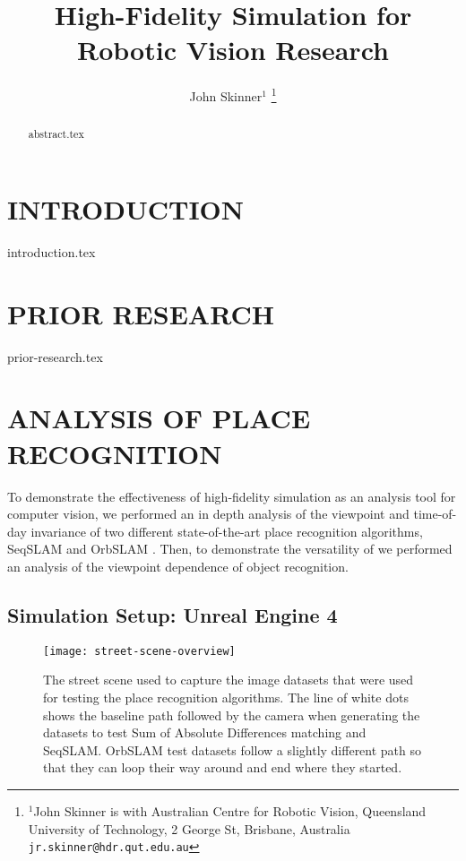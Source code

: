 \documentclass[letterpaper, 10 pt, conference]{ieeeconf}  %
\title{\LARGE \bf
High-Fidelity Simulation for Robotic Vision Research
}
\author{John Skinner$^{1}$%
\thanks{$^{1}$John Skinner is with Australian Centre for Robotic Vision,
        Queensland University of Technology,
        2 George St, Brisbane, Australia
        {\tt\small jr.skinner@hdr.qut.edu.au}}%
}
\begin{document}
\maketitle
\thispagestyle{empty}
\pagestyle{empty}


\begin{abstract}

{abstract.tex}

\end{abstract}


\section{INTRODUCTION}

{introduction.tex}

\section{PRIOR RESEARCH}

{prior-research.tex}

\section{ANALYSIS OF PLACE RECOGNITION}

To demonstrate the effectiveness of high-fidelity simulation as an analysis tool for computer vision, we performed an in depth analysis of the viewpoint and time-of-day invariance of two different state-of-the-art place recognition algorithms, SeqSLAM \cite{Milford2012} and OrbSLAM \cite{Montiel2015}. Then, to demonstrate the versatility of we performed an analysis of the viewpoint dependence of object recognition.

\subsection{Simulation Setup: Unreal Engine 4}

\begin{figure*}[t]
    \texttt{[image: street-scene-overview]}
    \caption{The street scene used to capture the image datasets that were used for testing the place recognition algorithms. The line of white dots shows the baseline path followed by the camera when generating the datasets to test Sum of Absolute Differences matching and SeqSLAM. OrbSLAM test datasets follow a slightly different path so that they can loop their way around and end where they started.}
    \label{fig:street-scene-overview}
\end{figure*}
\end{document}
